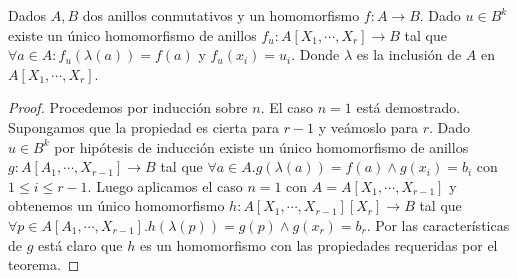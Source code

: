 \begin{theorem}
Dados $A,B$ dos anillos conmutativos y un homomorfismo $f: A \to B$. Dado $u \in B^k$ existe un único homomorfismo de anillos $f_u: A[X_1,\cdots,X_r] \to B$ tal que $\forall a \in A:f_u(\lambda(a)) = f(a)$ y $f_u(x_i) = u_i$. Donde $\lambda$ es la inclusión de $A$ en $A[X_1,\cdots,X_r]$. 

\begin{figure}[H]
\centering
{}
\end{figure}
\end{theorem}
\begin{proof}
Procedemos por inducción sobre $n$. El caso $n = 1$ está demostrado. Supongamos que la propiedad es cierta para $r-1$ y veámoslo para $r$. Dado $u \in B^k$ por hipótesis de inducción existe un único homomorfismo de anillos $g:A[A_1,\cdots,X_{r-1}] \to B$ tal que $\forall a \in A. g(\lambda(a)) = f(a) \land g(x_i) = b_i$ con $1 \le i \le r-1$. Luego aplicamos el caso $n = 1$ con $A = A[X_1,\cdots,X_{r-1}]$ y obtenemos un único homomorfismo $h:A[X_1,\cdots,X_{r-1}][X_r] \to B$ tal que $\forall p \in A[A_1, \cdots,X_{r-1}]. h(\lambda(p)) = g(p) \land g(x_r) = b_r$. Por las características de $g$ está claro que $h$ es un homomorfismo con las propiedades requeridas por el teorema. 
\end{proof}